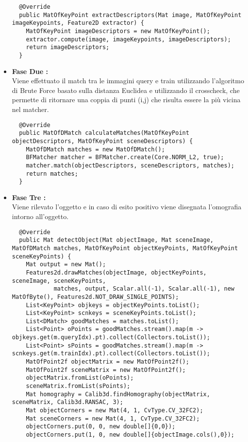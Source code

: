 \begin{itemize}
\begin{lstlisting}
  @Override
  public MatOfKeyPoint extractDescriptors(Mat image, MatOfKeyPoint imageKeypoints, Feature2D extractor) {
    MatOfKeyPoint imageDescriptors = new MatOfKeyPoint();
    extractor.compute(image, imageKeypoints, imageDescriptors);
    return imageDescriptors;
  }
\end{lstlisting}
\item \textbf{Fase Due :}\\
Viene effettuato il match tra le immagini query e train utilizzando l'algoritmo di Brute Force basato sulla distanza Euclidea e utilizzando il crosscheck, che permette di ritornare una coppia di punti (i,j) che risulta essere la più vicina nel matcher.
\begin{lstlisting}
  @Override
  public MatOfDMatch calculateMatches(MatOfKeyPoint objectDescriptors, MatOfKeyPoint sceneDescriptors) {
    MatOfDMatch matches = new MatOfDMatch();
    BFMatcher matcher = BFMatcher.create(Core.NORM_L2, true);
    matcher.match(objectDescriptors, sceneDescriptors, matches);
    return matches;
  }
\end{lstlisting}
\item \textbf{Fase Tre :}\\
Viene rilevato l'oggetto e in caso di esito positivo viene disegnata l'omografia intorno all'oggetto.
\begin{lstlisting}
  @Override
  public Mat detectObject(Mat objectImage, Mat sceneImage, MatOfDMatch matches, MatOfKeyPoint objectKeyPoints, MatOfKeyPoint sceneKeyPoints) {
    Mat output = new Mat();
    Features2d.drawMatches(objectImage, objectKeyPoints, sceneImage, sceneKeyPoints, 
            matches, output, Scalar.all(-1), Scalar.all(-1), new MatOfByte(), Features2d.NOT_DRAW_SINGLE_POINTS);
    List<KeyPoint> objkeys = objectKeyPoints.toList();
    List<KeyPoint> scnkeys = sceneKeyPoints.toList();
    List<DMatch> goodMatches = matches.toList();
    List<Point> oPoints = goodMatches.stream().map(m -> objkeys.get(m.queryIdx).pt).collect(Collectors.toList());
    List<Point> sPoints = goodMatches.stream().map(m -> scnkeys.get(m.trainIdx).pt).collect(Collectors.toList());
    MatOfPoint2f objectMatrix = new MatOfPoint2f();
    MatOfPoint2f sceneMatrix = new MatOfPoint2f();
    objectMatrix.fromList(oPoints);
    sceneMatrix.fromList(sPoints);
    Mat homography = Calib3d.findHomography(objectMatrix, sceneMatrix, Calib3d.RANSAC, 3);
    Mat objectCorners = new Mat(4, 1, CvType.CV_32FC2);
    Mat sceneCorners = new Mat(4, 1, CvType.CV_32FC2);
    objectCorners.put(0, 0, new double[]{0,0});
    objectCorners.put(1, 0, new double[]{objectImage.cols(),0});

\end{lstlisting}
\end{itemize}
